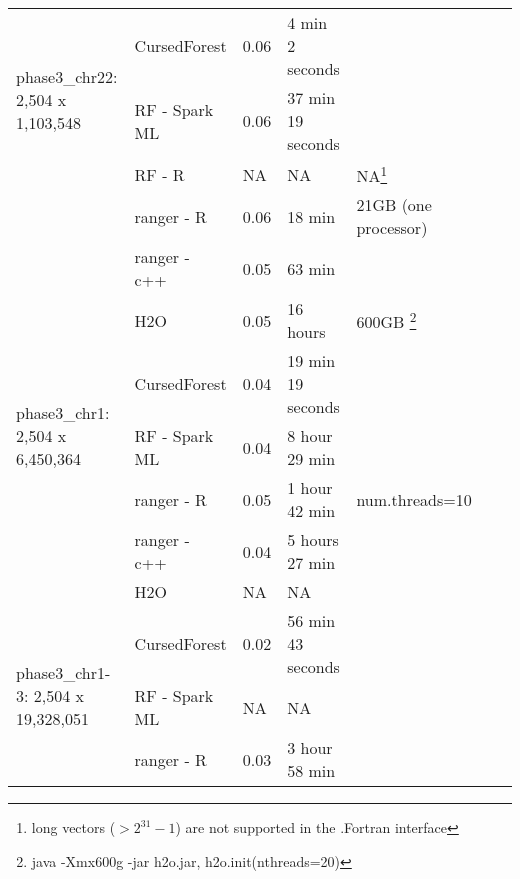 \documentclass[11pt]{article}
\newcommand{\cursedforest}{{\sc CursedForest}}
\begin{document}
\begin{sidewaystable}[!ht]
\begin{minipage}{\textwidth}
\begin{tabular}{|l|l|l|l|l|l|p{1cm}|}
 \hline
\multirow{3}{*}{phase3\_chr22: 2,504 x 1,103,548}   & \cursedforest & 0.06 & 4 min 2 seconds & \\  %
						  & RF - Spark ML   & 0.06 & 37 min 19 seconds  & \\  %
                                                    & RF - R        & NA         & NA               & NA\footnote{long vectors ($> 2^31-1$)  are not supported in the .Fortran interface} \\ %
                                                    & ranger - R    & 0.06       & 18 min        & 21GB (one processor) \\ %
                                                    & ranger - c++ & 0.05  & 63 min &   \\
			                           & H2O           & 0.05       & 16 hours         & 600GB \footnote{java -Xmx600g -jar h2o.jar,   h2o.init(nthreads=20)} \\  %
\hline
\multirow{3}{*}{phase3\_chr1: 2,504 x 6,450,364}    & \cursedforest & 0.04  & 19 min 19 seconds &        \\ %
                                                    & RF - Spark ML  &  0.04       & 8 hour 29 min   &     \\ %
                                                   & ranger - R      & 0.05       & 1 hour 42 min          & num.threads=10 \\ %
                                                   & ranger - c++ & 0.04 & 5 hours 27 min &  \\
                                                    &H2O & NA & NA &   \\
\hline
\multirow{3}{*}{phase3\_chr1-3: 2,504 x 19,328,051} & \cursedforest & 0.02  & 56 min 43 seconds     &        \\ %
                                                    & RF - Spark ML  &  NA           &  NA                                                     & \\ %
  						 & ranger - R      & 0.03      &    3 hour 58 min  &   \\ %
						 

\end{tabular}
\end{minipage}
\end{sidewaystable}
\end{document}
